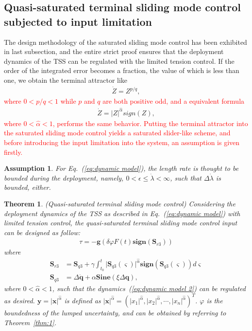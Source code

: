 \documentclass[3p]{elsarticle}
\theoremstyle{plain}
\newtheorem{myas}{Assumption}
\newtheorem{mythm}{Theorem}
\theoremstyle{remark}
\begin{document}
\subsection{Quasi-saturated terminal sliding mode control subjected to input limitation}
The design methodology of the saturated sliding mode control has been exhibited in last subsection, and the entire strict proof ensures that the deployment dynamics of the TSS can be regulated with the limited tension control. If the order of the integrated error becomes a fraction, the value of which is less than one, we obtain the terminal attractor like
\begin{align}
\dot Z = Z^{p/q},
\end{align}
\textcolor{red}{where $0<p/q<1$ while $p$ and $q$ are both positive odd, and a equivalent formula}
\begin{align}
\dot Z = \vert Z\vert^{\hat\alpha} {sign}(Z),
\end{align}
\textcolor{red}{where $0<\hat \alpha<1$, performs the same behavior. Putting the terminal attractor into the saturated sliding mode control yields a saturated slider-like scheme, and before introducing the input limitation into the system, an assumption is given firstly.}
\begin{myas}\label{as:1}
For Eq.~(\ref{eq:dynamic model}), the length rate is thought to be bounded during the deployment, namely, $0<\epsilon\le\dot \lambda<\infty$, such that $\Delta \dot \lambda$ is bounded, either.
\end{myas}
\begin{mythm}\label{thm:2}(Quasi-saturated terminal sliding mode control)
Considering the deployment dynamics of the TSS as described in Eq.~(\ref{eq:dynamic model}) with limited tension control, the quasi-saturated terminal sliding mode control input can be designed as follow:
\begin{align}
\tau = -\bm{g}(\delta\varphi F(t) \bm{sign}(\bm S_{r3}))
\end{align}
where
\begin{align}
\bm S_{r3} &= \bm S_{q3}+\gamma\int^t_{t_0}\vert \bm S_{q3}(\varsigma)\vert^{\hat\alpha}  \bm{sign}(\bm S_{q3}(\varsigma))d\varsigma\label{eq:Sr3}\\
\bm S_{q3} &= \Delta \dot {\bm q}+\alpha \bm{Sine}(\xi\Delta \bm q),\label{eq:Sq3}
\end{align}
where $0<\hat\alpha< 1$, such that the dynamics~(\ref{eq:dynamic model 2}) can be regulated as desired. $\bm y=\vert \bm x\vert^{\hat\alpha}$ is defined as $\vert \bm x\vert^{\hat\alpha} =\left(\vert x_1\vert^{\hat\alpha},\vert x_2\vert^{\hat\alpha},\cdots,\vert x_n\vert^{\hat\alpha}\right)^T$. $\varphi$ is the boundedness of the lumped uncertainty, and can be obtained by referring to Theorem~\ref{thm:1}.
\end{mythm}
\end{document}
